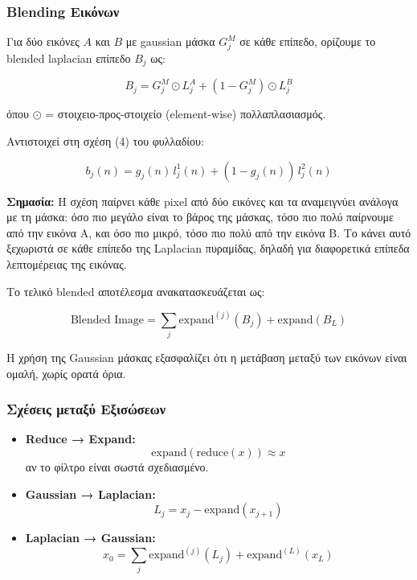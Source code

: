 \documentclass[12pt]{article}
\begin{document}
\subsubsection{Blending Εικόνων}

Για δύο εικόνες $A$ και $B$ με gaussian μάσκα $G^M_j$ σε κάθε επίπεδο, ορίζουμε το blended laplacian επίπεδο $B_j$ ως:

\begin{equation}
B_j = G^M_j \odot L^A_j + (1 - G^M_j) \odot L^B_j
\label{eq:blending}
\end{equation}

όπου $\odot$ = στοιχειο-προς-στοιχείο (element-wise) πολλαπλασιασμός.  

Αντιστοιχεί στη σχέση (4) του φυλλαδίου:

\begin{equation}
b_j(n) = g_j(n) \, l^1_j(n) + (1-g_j(n)) \, l^2_j(n)
\end{equation}

\textbf{Σημασία:} Η σχέση παίρνει κάθε pixel από δύο εικόνες και τα αναμειγνύει ανάλογα με τη μάσκα: όσο πιο μεγάλο είναι το βάρος της μάσκας, τόσο πιο πολύ παίρνουμε από την εικόνα A, και όσο πιο μικρό, τόσο πιο πολύ από την εικόνα B.
Το κάνει αυτό ξεχωριστά σε κάθε επίπεδο της Laplacian πυραμίδας, δηλαδή για διαφορετικά επίπεδα λεπτομέρειας της εικόνας. 

Το τελικό blended αποτέλεσμα ανακατασκευάζεται ως:

\begin{equation}
\text{Blended Image} = \sum_j \text{expand}^{(j)}(B_j) + \text{expand}(B_L)
\label{eq:blended_reconstruction}
\end{equation}

Η χρήση της Gaussian μάσκας εξασφαλίζει ότι η μετάβαση μεταξύ των εικόνων είναι ομαλή, χωρίς ορατά όρια.

\subsubsection{Σχέσεις μεταξύ Εξισώσεων}

\begin{itemize}
    \item \textbf{Reduce → Expand:} 
    \begin{equation}
    \text{expand}(\text{reduce}(x)) \approx x
    \label{eq:reduce_expand}
    \end{equation}
    αν το φίλτρο είναι σωστά σχεδιασμένο.
    
    \item \textbf{Gaussian → Laplacian:} 
    \begin{equation}
    L_j = x_j - \text{expand}(x_{j+1})
    \label{eq:gaussian_laplacian}
    \end{equation}
    
    \item \textbf{Laplacian → Gaussian:} 
    \begin{equation}
    x_0 = \sum_j \text{expand}^{(j)}(L_j) + \text{expand}^{(L)}(x_L)
    \label{eq:laplacian_gaussian}
    \end{equation}
\end{itemize}
\end{document}
